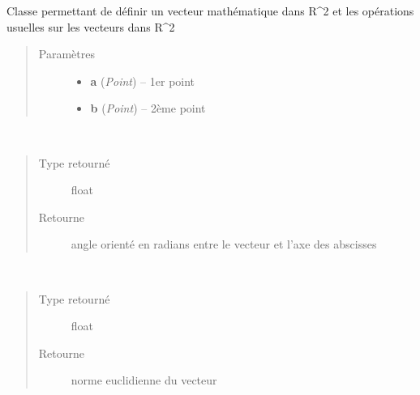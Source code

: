 \documentclass[letterpaper,10pt,french]{sphinxmanual}
\begin{document}
\begin{fulllineitems}
\label{math:lib.math.vecteur.Vecteur}
Classe permettant de définir un vecteur mathématique dans R\textasciicircum{}2 et les opérations usuelles sur les vecteurs dans R\textasciicircum{}2
\begin{quote}\begin{description}
\item[{Paramètres}] \leavevmode\begin{itemize}
\item {} 
\textbf{a} (\emph{Point}) -- 1er point

\item {} 
\textbf{b} (\emph{Point}) -- 2ème point

\end{itemize}

\end{description}\end{quote}

\begin{fulllineitems}
\label{math:lib.math.vecteur.Vecteur.angle}~\begin{quote}\begin{description}
\item[{Type retourné}] \leavevmode
float

\item[{Retourne}] \leavevmode
angle orienté en radians entre le vecteur et l'axe des abscisses

\end{description}\end{quote}

\end{fulllineitems}


\begin{fulllineitems}
\label{math:lib.math.vecteur.Vecteur.norme}~\begin{quote}\begin{description}
\item[{Type retourné}] \leavevmode
float

\item[{Retourne}] \leavevmode
norme euclidienne du vecteur

\end{description}\end{quote}

\end{fulllineitems}


\end{fulllineitems}
\end{document}
